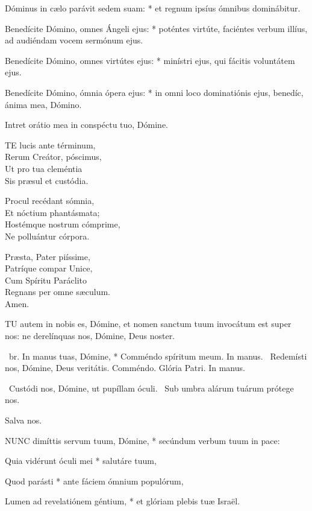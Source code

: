 Dóminus in cælo parávit sedem suam: * et regnum ipsíus ómnibus dominábitur.

Benedícite Dómino, omnes Ángeli ejus: * poténtes virtúte, faciéntes verbum illíus, ad audiéndam vocem sermónum ejus.

Benedícite Dómino, omnes virtútes ejus: * minístri ejus, qui fácitis voluntátem ejus.

Benedícite Dómino, ómnia ópera ejus: * in omni loco dominatiónis ejus, benedíc, ánima mea, Dómino.

 Intret orátio mea in conspéctu tuo, Dómine.


\lettrine[lines=2]{T}{E} lucis ante términum,\\
Rerum Creátor, póscimus,\\
Ut pro tua cleméntia\\
Sis præsul et custódia.

Procul recédant sómnia,\\
Et nóctium phantásmata;\\
Hostémque nostrum cómprime,\\
Ne polluántur córpora.

Præsta, Pater piíssime,\\
Patríque compar Unice,\\
Cum Spíritu Paráclito\\
Regnans per omne sæculum.\\
Amen.


\lettrine[lines=2]{T}{U} autem in nobis es, Dómine, et nomen sanctum tuum invocátum est super nos: ne derelínquas nos, Dómine, Deus noster.

\R\ br. In manus tuas, Dómine, * Comméndo spíritum meum. In manus. \V\ Redemísti nos, Dómine, Deus veritátis. Comméndo. Glória Patri. In manus.

\V\ Custódi nos, Dómine, ut pupíllam óculi. \R\ Sub umbra alárum tuárum prótege nos.

 Salva nos.


\lettrine[lines=2]{N}{UNC} dimíttis servum tuum, Dómine, * secúndum verbum tuum in pace:

Quia vidérunt óculi mei * salutáre tuum,

Quod parásti * ante fáciem ómnium populórum,

Lumen ad revelatiónem géntium, * et glóriam plebis tuæ Israël.

